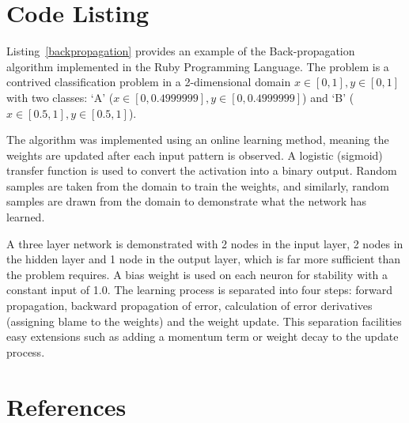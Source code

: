 \documentclass[a4paper, 11pt]{article}
\begin{document}
\section{Code Listing}
\label{sec:code}
Listing~\ref{backpropagation} provides an example of the Back-propagation algorithm implemented in the Ruby Programming Language. 
The problem is a contrived classification problem in a 2-dimensional domain $x\in[0,1], y\in[0,1]$ with two classes: `A' ($x\in[0,0.4999999], y\in[0,0.4999999]$) and `B' ($x\in[0.5,1], y\in[0.5,1]$).

The algorithm was implemented using an online learning method, meaning the weights are updated after each input pattern is observed. A logistic (sigmoid) transfer function is used to convert the activation into a binary output. Random samples are taken from the domain to train the weights, and similarly, random samples are drawn from the domain to demonstrate what the network has learned. 

A three layer network is demonstrated with 2 nodes in the input layer, 2 nodes in the hidden layer and 1 node in the output layer, which is far more sufficient than the problem requires. A bias weight is used on each neuron for stability with a constant input of 1.0. The learning process is separated into four steps: forward propagation, backward propagation of error, calculation of error derivatives (assigning blame to the weights) and the weight update. This separation facilities easy extensions such as adding a momentum term or weight decay to the update process.




\section{References}
\label{sec:references}
\end{document}
